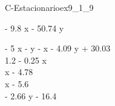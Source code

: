 
\begin{bilevelmodel}{C-Estacionario}{ex9_1_9}
    \begin{upperlevel}{- 9.8 x - 50.74 y}{
        
    }
    \end{upperlevel}
    \begin{lowerlevel}{- 5 x - y}{
         - x - 4.09 y + 30.03  \\ 
 1.2 - 0.25 x  \\ 
 x - 4.78  \\ 
 x - 5.6  \\ 
 - 2.66 y - 16.4 
    }
    \end{lowerlevel}
\end{bilevelmodel}
    
        